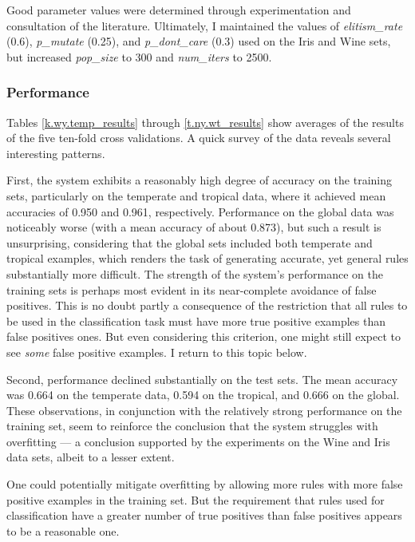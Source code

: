 \documentclass[11pt]{article}
\begin{document}
Good parameter values were determined through experimentation and consultation of the literature. Ultimately, I maintained the values of \textit{elitism\_rate} (0.6), \textit{p\_mutate} (0.25), and \textit{p\_dont\_care} (0.3) used on the Iris and Wine sets, but increased \textit{pop\_size} to 300 and \textit{num\_iters} to 2500.

\subsubsection{Performance}

Tables \ref{k.wy.temp_results} through \ref{t.ny.wt_results} show averages of the results of the five ten-fold cross validations. A quick survey of the data reveals several interesting patterns.

First, the system exhibits a reasonably high degree of accuracy on the training sets, particularly on the temperate and tropical data, where it achieved mean accuracies of 0.950 and 0.961, respectively. Performance on the global data was noticeably worse (with a mean accuracy of about 0.873), but such a result is unsurprising, considering that the global sets included both temperate and tropical examples, which renders the task of generating accurate, yet general rules substantially more difficult. The strength of the system's performance on the training sets is perhaps most evident in its near-complete avoidance of false positives. This is no doubt partly a consequence of the restriction that all rules to be used in the classification task must have more true positive examples than false positives ones. But even considering this criterion, one might still expect to see \emph{some} false positive examples. I return to this topic below.

Second, performance declined substantially on the test sets. The mean accuracy was 0.664 on the temperate data, 0.594 on the tropical, and 0.666 on the global. These observations, in conjunction with the relatively strong performance on the training set, seem to reinforce the conclusion that the system struggles with overfitting --- a conclusion supported by the experiments on the Wine and Iris data sets, albeit to a lesser extent.

One could potentially mitigate overfitting by allowing more rules with more false positive examples in the training set. But the requirement that rules used for classification have a greater number of true positives than false positives appears to be a reasonable one. 
\end{document}
